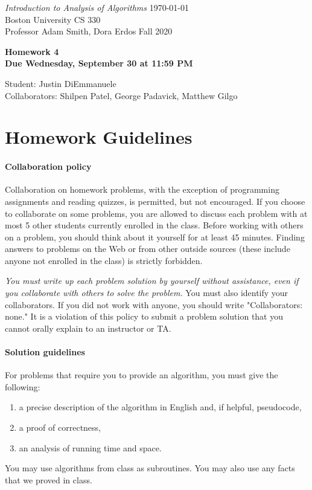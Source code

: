 \documentclass[letterpaper,11pt]{article}
\begin{document}
{\noindent\large
{\em Introduction to Analysis of Algorithms} \hfill \today\\
Boston University \hfill CS 330\\
Professor  Adam Smith, Dora Erdos \hfill Fall 2020\\}
\vspace{1pt}
\hrulefill\vspace{3mm}
\begin{center}
{\LARGE\bf Homework 4}\\
{\bf Due Wednesday, September 30 at 11:59 PM}
\end{center}

\begin{center}
    \color{teal}
   Student: Justin DiEmmanuele \\
    Collaborators: Shilpen Patel, George Padavick, Matthew Gilgo
\end{center}


\section*{Homework Guidelines}

\paragraph{Collaboration policy} Collaboration on homework problems, with the exception of
programming assignments and reading quizzes, is permitted, but not encouraged.
If you
choose to collaborate on some problems, you are allowed to discuss
each problem with at most 5 other students currently enrolled in the
class.
Before working with others on a problem, you should think about it
yourself for at least 45 minutes. Finding answers to problems on the
Web or from other outside sources (these include anyone not enrolled
in the class) is strictly forbidden.

{\em You must write up each problem solution by yourself without
assistance, even if you collaborate with others to solve the
problem.} You must also identify your collaborators. If you did not
work with anyone, you should write "Collaborators: none." It is a
violation of this policy to submit a problem solution that you
cannot orally explain to an instructor or TA.

\paragraph{Solution guidelines} For problems that require you to provide an algorithm, you must give the following:
    \begin{enumerate}
\item  a precise description of the algorithm in English and, if helpful, pseudocode,
\item a proof of correctness,
\item an analysis of running time and space.
\end{enumerate}
You may use algorithms from class as subroutines. You may also use any facts that we proved in class.
\end{document}
